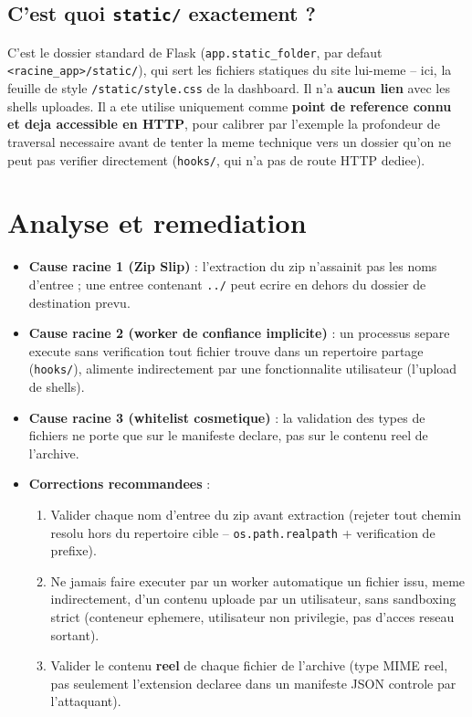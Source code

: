 \documentclass[11pt,a4paper]{article}
\begin{document}
\subsection{C'est quoi \texttt{static/} exactement ?}

C'est le dossier standard de Flask (\texttt{app.static\_folder}, par
defaut \texttt{<racine\_app>/static/}), qui sert les fichiers
statiques du site lui-meme -- ici, la feuille de style
\texttt{/static/style.css} de la dashboard. Il n'a \textbf{aucun lien}
avec les shells uploades. Il a ete utilise uniquement comme
\textbf{point de reference connu et deja accessible en HTTP}, pour
calibrer par l'exemple la profondeur de traversal necessaire avant de
tenter la meme technique vers un dossier qu'on ne peut pas verifier
directement (\texttt{hooks/}, qui n'a pas de route HTTP dediee).

\section{Analyse et remediation}

\begin{itemize}
  \item \textbf{Cause racine 1 (Zip Slip)} : l'extraction du zip
        n'assainit pas les noms d'entree ; une entree contenant
        \texttt{../} peut ecrire en dehors du dossier de destination
        prevu.
  \item \textbf{Cause racine 2 (worker de confiance implicite)} : un
        processus separe execute sans verification tout fichier trouve
        dans un repertoire partage (\texttt{hooks/}), alimente
        indirectement par une fonctionnalite utilisateur (l'upload de
        shells).
  \item \textbf{Cause racine 3 (whitelist cosmetique)} : la validation
        des types de fichiers ne porte que sur le manifeste declare,
        pas sur le contenu reel de l'archive.
  \item \textbf{Corrections recommandees} :
    \begin{enumerate}
      \item Valider chaque nom d'entree du zip avant extraction
            (rejeter tout chemin resolu hors du repertoire cible --
            \texttt{os.path.realpath} + verification de prefixe).
      \item Ne jamais faire executer par un worker automatique un
            fichier issu, meme indirectement, d'un contenu uploade par
            un utilisateur, sans sandboxing strict (conteneur ephemere,
            utilisateur non privilegie, pas d'acces reseau sortant).
      \item Valider le contenu \textbf{reel} de chaque fichier de
            l'archive (type MIME reel, pas seulement l'extension
            declaree dans un manifeste JSON controle par l'attaquant).
    \end{enumerate}
\end{itemize}
\end{document}
